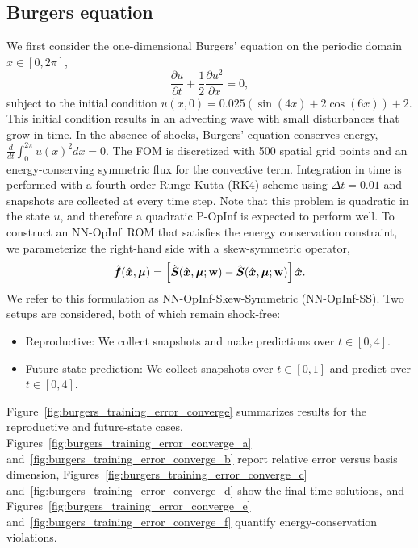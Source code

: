 \documentclass[3p,computermodern,11pt]{elsarticle}
\numberwithin{equation}{section}
\newcommand{\nnopinf}{NN-OpInf}
\newcommand{\reducedState}{\hat{\state}}
\newcommand{\reducedSkewMatrixLowerNN}{\hat{\boldsymbol S}}
\newcommand{\weights}{\mathbf{w}}
\newcommand{\reducedVelocity}{\skew{4}\hat{\velocity}}
\newcommand{\state}{\boldsymbol x}
\newcommand{\velocity}{\boldsymbol f}
\newcommand{\params}{\boldsymbol \mu}
\begin{document}
\subsection{Burgers equation}
We first consider the one-dimensional Burgers' equation on the periodic domain $x \in [0,2\pi]$,
$$\frac{\partial u}{\partial t} + \frac{1}{2} \frac{\partial u^2}{\partial x} = 0,$$
subject to the initial condition $u(x,0) = 0.025(\sin(4x) + 2\cos(6x)) + 2$. This initial condition results in an advecting wave with small disturbances that grow in time. In the absence of shocks, Burgers' equation conserves energy, $\frac{d}{dt}\int_{0}^{2 \pi} u(x)^2 dx = 0$. The FOM is discretized with 500 spatial grid points and 
an energy-conserving symmetric flux for the convective term. Integration in time is performed with a fourth-order Runge-Kutta (RK4) scheme using $\Delta t=0.01$ and snapshots are collected at every time step.  Note that this problem is quadratic in the state $u$, and therefore a quadratic P-OpInf is expected to perform well.
To construct an \nnopinf\ ROM that satisfies the energy conservation constraint, we parameterize the right-hand side with a skew-symmetric operator,
\begin{equation}\label{eq:nnopinf_skew}
\reducedVelocity(\reducedState,\params) =   \left[ \reducedSkewMatrixLowerNN(\reducedState,\params;\weights) - \reducedSkewMatrixLowerNN(\reducedState,\params;\weights) \right] \reducedState. 
\end{equation}
We refer to this formulation as NN-OpInf-Skew-Symmetric (NN-OpInf-SS).
Two setups are considered, both of which remain shock-free:
\begin{itemize}
\item Reproductive: We collect snapshots and make predictions over $t \in [0,4]$. 
\item Future-state prediction: We collect snapshots over $t \in [0,1]$ and predict over $t \in [0,4]$. 
\end{itemize}
Figure~\ref{fig:burgers_training_error_converge} summarizes results for the reproductive and future-state cases. Figures~\ref{fig:burgers_training_error_converge_a} and~\ref{fig:burgers_training_error_converge_b} report relative error versus basis dimension, Figures~\ref{fig:burgers_training_error_converge_c} and~\ref{fig:burgers_training_error_converge_d} show the final-time solutions, and Figures~\ref{fig:burgers_training_error_converge_e} and~\ref{fig:burgers_training_error_converge_f} quantify energy-conservation violations.
\end{document}

